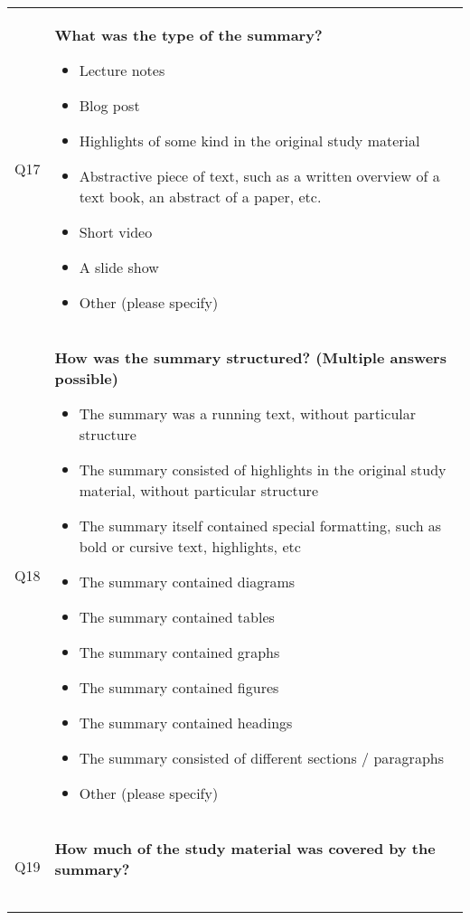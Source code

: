 \begin{xtabular}{@{\,}l <{\hskip 2pt} >{\raggedright\arraybackslash}p{0.82\textwidth}}
        \\

        Q17 & \textbf{What was the type of the summary?}
        \begin{itemize}[label=$\square$, leftmargin=*, nosep]
          \item Lecture notes
          \item Blog post
          \item Highlights of some kind in the original study material
          \item Abstractive piece of text, such as a written overview of a text book, an abstract of a paper, etc.
          \item Short video
          \item A slide show
          \item Other (please specify)
        \end{itemize}

        \\

        Q18 & \textbf{How was the summary structured? (Multiple answers possible)}
        \begin{itemize}[label=$\square$, leftmargin=*, nosep]
          \item The summary was a running text, without particular structure
          \item The summary consisted of highlights in the original study material, without particular structure
          \item The summary itself contained special formatting, such as bold or cursive text, highlights, etc
          \item The summary contained diagrams
          \item The summary contained tables
          \item The summary contained graphs
          \item The summary contained figures
          \item The summary contained headings
          \item The summary consisted of different sections / paragraphs
          \item Other (please specify)
        \end{itemize}

        \\

        Q19 & \textbf{How much of the study material was covered by the summary?}
        \begin{tabularx}{0.7\columnwidth}{
          !{\hskip 2pt}>{\centering\arraybackslash}p{0.13\columnwidth}
          !{\hskip 2pt}>{\centering\arraybackslash}p{0.13\columnwidth}
          !{\hskip 2pt}>{\centering\arraybackslash}p{0.13\columnwidth}
          !{\hskip 2pt}>{\centering\arraybackslash}p{0.13\columnwidth}
          !{\hskip 2pt}>{\centering\arraybackslash}p{0.13\columnwidth}}


\end{tabularx}
\end{xtabular}
